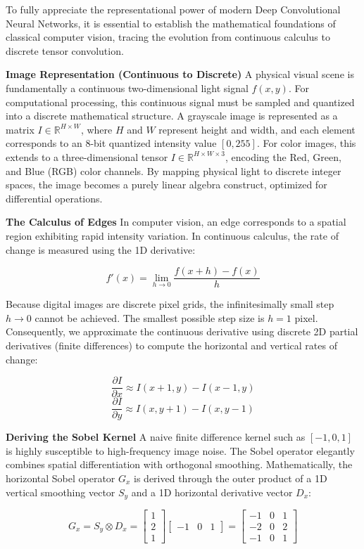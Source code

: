 To fully appreciate the representational power of modern Deep
Convolutional Neural Networks, it is essential to establish the
mathematical foundations of classical computer vision, tracing the
evolution from continuous calculus to discrete tensor convolution.

\textbf{Image Representation (Continuous to Discrete)} A physical visual
scene is fundamentally a continuous two-dimensional light signal
\(f(x, y)\). For computational processing, this continuous signal must
be sampled and quantized into a discrete mathematical structure. A
grayscale image is represented as a matrix
\(I \in \mathbb{R}^{H \times W}\), where \(H\) and \(W\) represent
height and width, and each element corresponds to an 8-bit quantized
intensity value \([0, 255]\). For color images, this extends to a
three-dimensional tensor \(I \in \mathbb{R}^{H \times W \times 3}\),
encoding the Red, Green, and Blue (RGB) color channels. By mapping
physical light to discrete integer spaces, the image becomes a purely
linear algebra construct, optimized for differential operations.

\textbf{The Calculus of Edges} In computer vision, an edge corresponds
to a spatial region exhibiting rapid intensity variation. In continuous
calculus, the rate of change is measured using the 1D derivative:

\[f'(x) = \lim_{h \to 0} \frac{f(x+h) - f(x)}{h}\]

Because digital images are discrete pixel grids, the infinitesimally
small step \(h \to 0\) cannot be achieved. The smallest possible step
size is \(h = 1\) pixel. Consequently, we approximate the continuous
derivative using discrete 2D partial derivatives (finite differences) to
compute the horizontal and vertical rates of change:

\[\frac{\partial I}{\partial x} \approx I(x+1, y) - I(x-1, y)\]
\[\frac{\partial I}{\partial y} \approx I(x, y+1) - I(x, y-1)\]

\textbf{Deriving the Sobel Kernel} A naive finite difference kernel such
as \([-1, 0, 1]\) is highly susceptible to high-frequency image noise.
The Sobel operator elegantly combines spatial differentiation with
orthogonal smoothing. Mathematically, the horizontal Sobel operator
\(G_x\) is derived through the outer product of a 1D vertical smoothing
vector \(S_y\) and a 1D horizontal derivative vector \(D_x\):

\[G_x = S_y \otimes D_x = \begin{bmatrix} 1 \\ 2 \\ 1 \end{bmatrix} \begin{bmatrix} -1 & 0 & 1 \end{bmatrix} = \begin{bmatrix} -1 & 0 & 1 \\ -2 & 0 & 2 \\ -1 & 0 & 1 \end{bmatrix}\]


